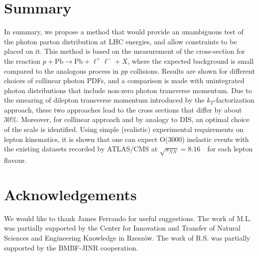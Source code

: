\section{Summary}

In summary, we propose a method that would provide an unambiguous test of the photon parton distribution at LHC energies, and allow 
constraints to be placed on it.
This method is based on the measurement of the cross-section for the reaction $p+\textrm{Pb}\rightarrow \textrm{Pb} + \ell^+\ell^- + X$, where the expected background is small compared to the analogous process in $pp$ collisions. 
Results are shown for different choices of collinear photon PDFs, and a comparison is made with unintegrated photon distributions that include non-zero photon transverse momentum.
Due to the smearing of dilepton transverse momentum introduced by the $k_T$-factorization approach, these two approaches lead to the cross sections that differ by about 30\%.
Moreover, for collinear approach and  by analogy to DIS, an optimal choice of the scale is identified.
Using simple (realistic) experimental requirements on lepton kinematics, it is shown that one can expect O(3000) inelastic events with the existing datasets recorded by ATLAS/CMS at $\sqrt{s_{N N}} = 8.16$~\TeV\ for each lepton flavour.


\section*{Acknowledgements}
We would like to thank James Ferrando for useful suggestions.
The work of M.L. was partially supported by the Center for Innovation and
Transfer of Natural Sciences and Engineering Knowledge in Rzesz{\'o}w.
The work of R.S. was partially supported by the BMBF-JINR cooperation.
